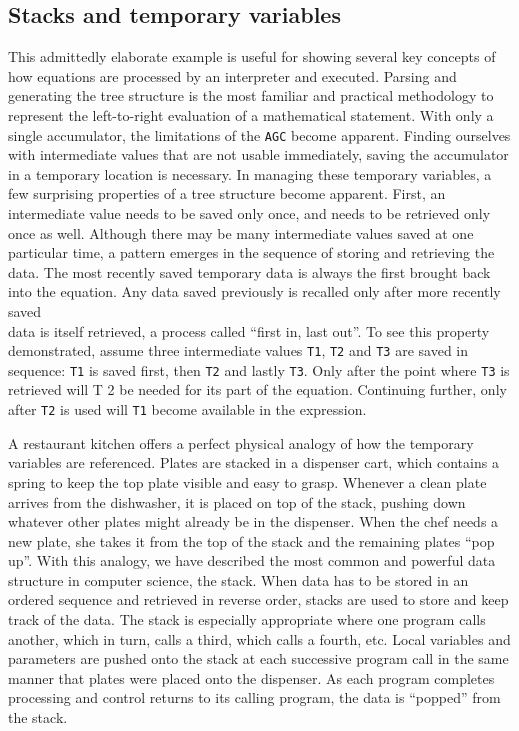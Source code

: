 \documentclass[refcap, oxford]{ahsan}
\begin{document}
\subsection{Stacks and temporary variables}
This admittedly elaborate example is useful for showing several key concepts of how equations are processed by an interpreter and executed. Parsing and generating the tree structure is the most familiar and practical methodology to represent the left-to-right evaluation of a mathematical statement. With only a single accumulator, the limitations of the \texttt{AGC} become apparent. Finding ourselves with intermediate values that are not usable immediately, saving the accumulator in a temporary location is necessary. In managing these temporary variables, a few surprising properties of a tree structure become apparent. First, an intermediate value needs to be saved only once, and needs to be retrieved only once as well. Although there may be many intermediate values saved at one particular time, a pattern emerges in the sequence of storing and retrieving the data. The most recently saved temporary data is always the first brought back into the equation. Any data saved previously is recalled only after more recently saved\\
data is itself retrieved, a process called ``first in, last out''. To see this property demonstrated, assume three intermediate values \texttt{T1}, \texttt{T2} and \texttt{T3} are saved in sequence: \texttt{T1} is saved first, then \texttt{T2} and lastly \texttt{T3}. Only after the point where \texttt{T3} is retrieved will T 2 be needed for its part of the equation. Continuing further, only after \texttt{T2} is used will \texttt{T1} become available in the expression.

A restaurant kitchen offers a perfect physical analogy of how the temporary variables are referenced. Plates are stacked in a dispenser cart, which contains a spring to keep the top plate visible and easy to grasp. Whenever a clean plate arrives from the dishwasher, it is placed on top of the stack, pushing down whatever other plates might already be in the dispenser. When the chef needs a new plate, she takes it from the top of the stack and the remaining plates ``pop up''. With this analogy, we have described the most common and powerful data structure in computer science, the stack. When data has to be stored in an ordered sequence and retrieved in reverse order, stacks are used to store and keep track of the data. The stack is especially appropriate where one program calls another, which in turn, calls a third, which calls a fourth, etc. Local variables and parameters are pushed onto the stack at each successive program call in the same manner that plates were placed onto the dispenser. As each program completes processing and control returns to its calling program, the data is ``popped'' from the stack.
\end{document}
